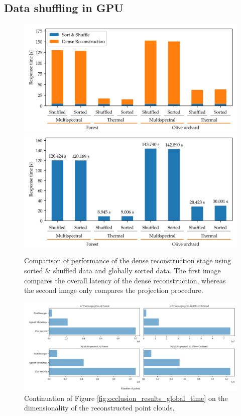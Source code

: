 \subsection{Data shuffling in GPU}

\begin{figure}
\includegraphics[width=\linewidth]{figs/multi_thermal_projection/results/stacked_stage_response_time.png}
\includegraphics[width=\linewidth]{figs/multi_thermal_projection/results/shuffled_response_time.png}
\caption{Comparison of performance of the dense reconstruction stage using sorted \& shuffled data and globally sorted data. The first image compares the overall latency of the dense reconstruction, whereas the second image only compares the projection procedure.}
\label{fig:shuffle_comparison}
\end{figure}

\begin{figure}
    \ContinuedFloat
    \centering
    \includegraphics[width=\linewidth]{figs/multi_thermal_projection/results/point_cloud_size.png}
    \caption{Continuation of Figure \ref{fig:occlusion_results_global_time} on the dimensionality of the reconstructed point clouds. }
    \label{fig:occlusion_point_cloud_size}
\end{figure}

